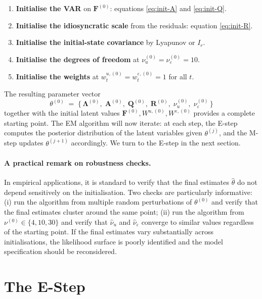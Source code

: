 \documentclass[11pt, a4paper, oneside]{article}
\newcommand{\mF}{\mathbf{F}}
\newcommand{\mL}{\boldsymbol{\Lambda}}
\newcommand{\mA}{\mathbf{A}}
\newcommand{\mR}{\mathbf{R}}
\newcommand{\mQ}{\mathbf{Q}}
\begin{document}
\begin{enumerate}[leftmargin=1.5em, itemsep=3pt]
    \item \textbf{Initialise the VAR} on $\mF^{(0)}$: equations
          \eqref{eq:init-A} and \eqref{eq:init-Q}.
    \item \textbf{Initialise the idiosyncratic scale} from the
          residuals: equation \eqref{eq:init-R}.
    \item \textbf{Initialise the initial-state covariance} by Lyapunov
          or $I_r$.
    \item \textbf{Initialise the degrees of freedom} at
          $\nu_u^{(0)} = \nu_\varepsilon^{(0)} = 10$.
    \item \textbf{Initialise the weights} at $w^{u,(0)}_t =
          w^{\varepsilon,(0)}_t = 1$ for all $t$.
\end{enumerate}
The resulting parameter vector 
\[
\theta^{(0)} \;=\; \big\{\,\mL^{(0)},\; \mA^{(0)},\; \mQ^{(0)},\; \mR^{(0)},\; \nu_u^{(0)},\; \nu_\varepsilon^{(0)}\,\big\}
\]
together with the initial latent values $\mF^{(0)}, W^{u,(0)},
W^{\varepsilon,(0)}$ provides a complete starting point. The EM
algorithm will now iterate: at each step, the E-step computes the
posterior distribution of the latent variables given
$\theta^{(j)}$, and the M-step updates $\theta^{(j+1)}$ accordingly.
We turn to the E-step in the next section.



\paragraph{A practical remark on robustness checks.}
In empirical applications, it is standard to verify that the final
estimates $\hat{\theta}$ do not depend sensitively on the initialisation.
Two checks are particularly informative: (i) run the algorithm from
multiple random perturbations of $\theta^{(0)}$ and verify that the
final estimates cluster around the same point; (ii) run the algorithm
from $\nu^{(0)} \in \{4, 10, 30\}$ and verify that $\hat{\nu}_u$ and
$\hat{\nu}_\varepsilon$ converge to similar values regardless of the
starting point. If the final estimates vary substantially across
initialisations, the likelihood surface is poorly identified and the
model specification should be reconsidered.

\newpage

\section{The E-Step}
\label{sec:e-step}
\end{document}
